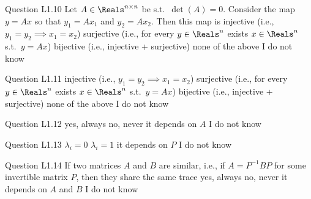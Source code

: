 \begin{frame}{Question L1.10}
	\QuestionNotes{}
	\QuestionBody
	{
		Let $A \in \Reals^{n \times n}$ be s.t.\ $\det \left( A \right) = 0$. Consider the map $y = A x$ so that $y_{1} = A x_{1}$ and $y_{2} = A x_{2}$. Then this map is
	}
	\QuestionAnswers
	{
		\answer injective (i.e., $y_1 = y_2 \implies x_1 = x_2$)
		\answer surjective (i.e., for every $y \in \Reals^n$ exists $x \in \Reals^{n}$ s.t.\ $y = Ax$)
		\answer bijective (i.e., injective + surjective)
		\correctanswer none of the above
		\answer I do not know
	}
\end{frame}


\begin{frame}{Question L1.11}
	\QuestionNotes{}
	\QuestionAnswers
	{
		\answer injective (i.e., $y_{1} = y_{2} \implies x_{1} = x_{2}$)
		\answer surjective (i.e., for every $y \in \Reals^{n}$ exists $x \in \Reals^{n}$ s.t.\ $y = A x$)
		\answer bijective (i.e., injective + surjective)
		\correctanswer none of the above
		\answer I do not know
	}
\end{frame}


\begin{frame}{Question L1.12}
	\QuestionNotes{}
	\QuestionAnswers
	{
		\answer yes, always
		\answer no, never
		\correctanswer it depends on $A$
		\answer I do not know
	}
\end{frame}


\begin{frame}{Question L1.13}
	\QuestionNotes{}
	\QuestionAnswers
	{
		\correctanswer $\lambda_{i} = 0$
		\answer $\lambda_{i} = 1$
		\answer it depends on $P$
		\answer I do not know
	}
\end{frame}


\begin{frame}{Question L1.14}
	\QuestionNotes{}
	\QuestionBody
	{
		If two matrices $A$ and $B$ are similar, i.e., if
		$ A = P^{-1} B P $
		for some invertible matrix $P$, then they share the same trace
	}
	\QuestionAnswers
	{
		\correctanswer yes, always
		\answer no, never
		\answer it depends on $A$ and $B$
		\answer I do not know
	}
\end{frame}


